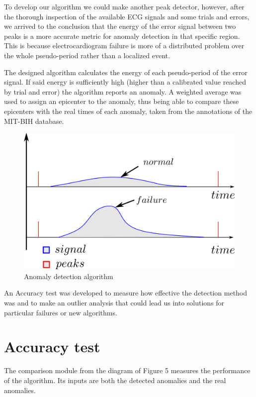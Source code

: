 \documentclass[conference]{IEEEtran}
\begin{document}
To develop our algorithm we could make another peak detector, however, after the thorough inspection of the available ECG signals and some trials and errors, we arrived to the conclusion that the energy of the error signal between two peaks is a more accurate metric for anomaly detection in that specific region. This is because electrocardiogram failure is more of a distributed problem over the whole pseudo-period rather than a localized event.\par

The designed algorithm calculates the energy of each pseudo-period of the error signal. If said energy is sufficiently high (higher than a calibrated value reached by trial and error) the algorithm reports an anomaly. A weighted average was used to assign an epicenter to the anomaly, thus being able to compare these epicenters with the real times of each anomaly, taken from the annotations of the MIT-BIH database.

\begin{figure}[H]
\centerline{\includegraphics[scale=0.7]{imagenes/anomalyAlgo}}
\caption{Anomaly detection algorithm}
\label{fig}
\end{figure}

An Accuracy test was developed  to measure how effective the detection method was and to make an outlier analysis that could lead us into solutions for particular failures or new algorithms.

\section{Accuracy test}
The comparison module from the diagram of Figure 5 measures the performance of the algorithm. Its inputs are both the detected anomalies and the real anomalies.\par
\end{document}
